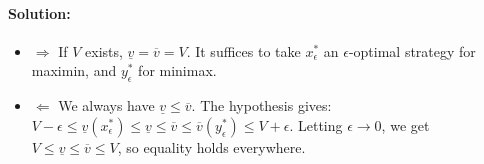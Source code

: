 \paragraph{Solution:}
\begin{itemize}
    \item $\Rightarrow$ If $V$ exists, $\underline{v} = \overline{v} = V$. It suffices to take $x^*_\epsilon$ an $\epsilon$-optimal strategy for maximin, and $y^*_\epsilon$ for minimax.
    \item $\Leftarrow$ We always have $\underline{v} \le \overline{v}$.
    The hypothesis gives: $V - \epsilon \le \underline{v}(x^*_\epsilon) \le \underline{v} \le \overline{v} \le \overline{v}(y^*_\epsilon) \le V + \epsilon$.
    Letting $\epsilon \to 0$, we get $V \le \underline{v} \le \overline{v} \le V$, so equality holds everywhere.
\end{itemize}
